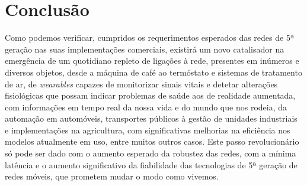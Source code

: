 \documentclass{llncs}
\begin{document}
\section{Conclusão}
Como podemos verificar, cumpridos os requerimentos esperados das redes de 5ª geração nas suas implementações comerciais, existirá um novo catalisador na emergência de um quotidiano repleto de ligações à rede, presentes em inúmeros e diversos objetos, desde a máquina de café ao termóstato e sistemas de tratamento de ar, de \textit{wearables} capazes de monitorizar sinais vitais e detetar alterações fisiológicas que possam indicar problemas de saúde aos de realidade aumentada, com informações em tempo real da nossa vida e do mundo que nos rodeia, da automação em automóveis, transportes públicos à gestão de unidades industriais e implementações na agricultura, com significativas melhorias na eficiência nos modelos atualmente em uso, entre muitos outros casos. Este passo revolucionário só pode ser dado com o aumento esperado da robustez das redes, com a mínima latência e o aumento significativo da fiabilidade das tecnologias de 5ª geração de redes móveis, que prometem mudar o modo como vivemos.
\end{document}
